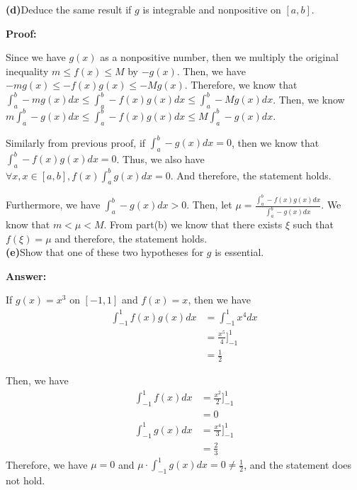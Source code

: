 \documentclass[a4paper,12pt]{report}
\begin{document}
\noindent
\textbf{(d)}Deduce the same result if $g$ is integrable and nonpositive on $[a,b]$.

\noindent
\textbf{Proof: }

\noindent
Since we have $g(x)$ as a nonpositive number, then we multiply the original inequality $m\leq f(x)\leq M$ by $-g(x)$. Then, we have $-mg(x)\leq -f(x)g(x)\leq -Mg(x)$. Therefore, we know that $\int_a^b-mg(x)dx\leq  \int_a^b-f(x)g(x)dx \leq \int_a^b-Mg(x)dx$. Then, we know $m\int_a^b-g(x)dx\leq  \int_a^b-f(x)g(x)dx \leq M\int_a^b-g(x)dx$. 

\noindent
Similarly from previous proof, if $\int_a^b-g(x)dx=0$, then we know that $\int_a^b-f(x)g(x)dx=0$. Thus, we also have $\forall x, x\in[a,b], f(x)\int_a^bg(x)dx=0$. And therefore, the statement holds.

\noindent
Furthermore, we have $\int_a^b-g(x)dx>0$. Then, let $\mu = \frac{\int_a^b-f(x)g(x)dx}{\int_a^b-g(x)dx}$. We know that $m< \mu <M$. From part(b) we know that there exists $\xi$ such that $f(\xi)=\mu$ and therefore, the statement holds.\\

\noindent
\textbf{(e)}Show that one of these two hypotheses for $g$ is essential. 

\noindent
\textbf{Answer: }

\noindent
If $g(x)=x^3$ on $[-1,1]$ and $f(x)=x$, then we have 
\begin{align*}
\int_{-1}^1f(x)g(x)dx&=\int_{-1}^1x^4dx\\
&=\frac{x^5}{4}]_{-1}^{1}\\
&=\frac{1}{2}
\end{align*}

\noindent
Then, we have 
\begin{align*}
\int_{-1}^1f(x)dx&=\frac{x^2}{2}]_{-1}^1\\
&=0\\
\int_{-1}^1g(x)dx&=\frac{x^4}{3}]_{-1}^1\\
&=\frac{2}{3}
\end{align*}
Therefore, we have $\mu =0$ and $\mu\cdot \int_{-1}^1g(x)dx=0\neq \frac{1}{2}$, and the statement does not hold. 
\end{document}
